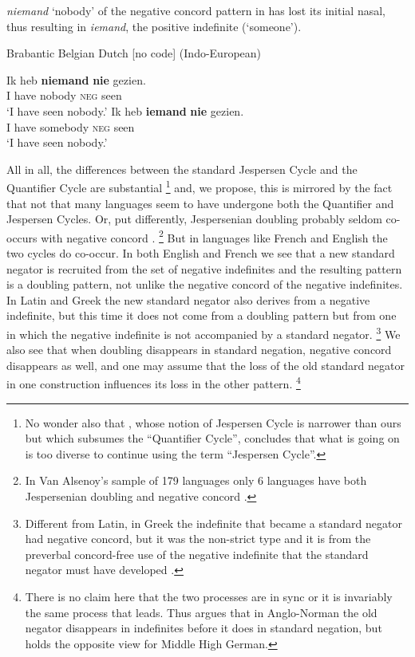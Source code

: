 ﻿\documentclass[output=paper]{langsci/langscibook}
\begin{document}
\textit{niemand} `nobody' of the negative concord pattern in
 has lost its initial nasal, thus resulting in
\textit{iemand}, the positive indefinite (`someone').
%
\begin{exe}\ex\label{ex:int-brabantic-nobody}
Brabantic Belgian Dutch [no code] (Indo-European)
    \begin{xlist}
    \ex\label{ex:int-brabantic-nobody-a}
    \gll Ik  heb  \textbf{niemand}  \textbf{nie}  gezien.  \\
    I  have  nobody  \textsc{neg}  seen \\
    \glt `I have seen nobody.'
    \ex\gll Ik  heb  \textbf{iemand}  \textbf{nie}  gezien.\\
    I  have  somebody  \textsc{neg}  seen\\ 
    \glt `I have seen nobody.'
    \end{xlist}\end{exe} 

All in all, the differences between the standard Jespersen Cycle and the
Quantifier Cycle are substantial%
%
    \footnote{No wonder also that \citet{Larrivee2011}, whose notion of
    Jespersen Cycle is narrower than ours but which subsumes the
    ``Quantifier Cycle'', concludes that what is going on is too diverse to
    continue using the term ``Jespersen Cycle''.} %
%
and, we propose, this is mirrored by the fact that not that many languages
seem to have undergone both the Quantifier and Jespersen Cycles. Or, put
differently, Jespersenian doubling probably seldom co-occurs with negative
concord \parencites{AlsenoyAuwera2014}[182--195]{Alsenoy2016}.%
%
\footnote{In Van Alsenoy's sample of 179 languages only 6 languages have
both Jespersenian doubling and negative concord
\parencite[187]{Alsenoy2016}.} %
%
But in languages like French and English the two
cycles do co-occur. In both English and French we see that a new standard
negator is recruited from the set of negative
indefinites and the resulting pattern is a doubling pattern, not unlike the
negative concord of the negative indefinites. In Latin and
Greek the new
standard negator also derives from a negative indefinite, but this time it
does not come from a doubling pattern but from one in which the negative
indefinite is not accompanied by a standard negator.%
%
\footnote{Different
from Latin, in Greek the indefinite that became a standard negator had
negative concord, but it was the non-strict type and it is from the
preverbal concord-free use of the negative indefinite that the standard
negator must have developed \citep[294--295]{Chatzopoulou2012}.} %
%
We also see
that when doubling disappears in standard negation, negative concord
disappears as well, and one may assume that the loss of the old standard
negator in one construction influences its loss in the other
pattern.%
%
\footnote{There is no claim here that the two processes are in sync
or it is invariably the same process that leads. Thus
\citet[152]{Ingham2011} argues that in Anglo-Norman the old negator
disappears in indefinites before it does in standard negation, but
\citet[176]{Jager2013} holds the opposite view for Middle High German.} %
\end{document}
